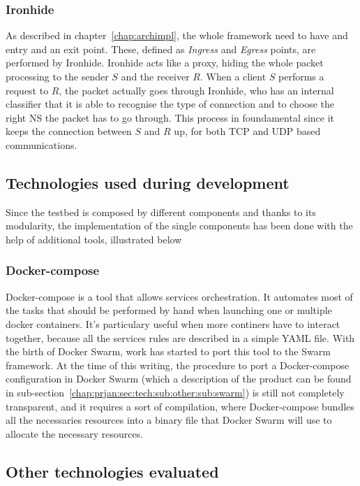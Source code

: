 \subsubsection{Ironhide}
As described in chapter~\ref{chap:archimpl}, the whole framework need to have 
and entry and an exit point. These, defined as \textit{Ingress} and 
\textit{Egress} points, are performed by Ironhide. Ironhide acts like a proxy, 
hiding the whole packet processing to the sender $S$ and the receiver $R$. When 
a client $S$ performs a request to $R$, the packet actually goes through 
Ironhide, who has an internal classifier that it is able to recognise the type 
of connection and to choose the right NS the packet has to go through. This 
process in foundamental since it keeps the connection between $S$ and $R$ up, 
for both TCP and UDP based communications.

\subsection{Technologies used during development}

Since the testbed is composed by different components and thanks to its 
modularity, the implementation of the single components has been done with the 
help of additional tools, illustrated below

\subsubsection{Docker-compose} 
Docker-compose is a tool that allows services orchestration. It automates most 
of the tasks that should be performed by hand when launching one or multiple 
docker containers. It's particulary useful when more continers have to interact 
together, because all the services rules are described in a simple 
YAML file. With the birth of Docker Swarm, work has started to port this tool to 
the Swarm framework. At the time of this writing, the procedure to port a 
Docker-compose configuration in Docker Swarm (which a description of the 
product can be found in 
sub-section~\ref{chap:prjan:sec:tech:sub:other:sub:swarm}) is still not 
completely transparent, and it requires a sort of compilation, where 
Docker-compose bundles all the necessaries resources into a binary file that 
Docker Swarm will use to allocate the necessary resources.

\subsection{Other technologies evaluated}

